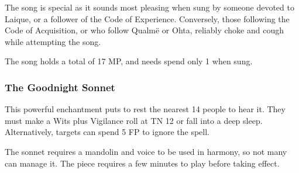 The song is special as it sounds most pleasing when sung by someone devoted to Laique, or a follower of the Code of Experience.  Conversely, those following the Code of Acquisition, or who follow Qualm\"{e} or Ohta, reliably choke and cough while attempting the song.

The song holds a total of 17 MP, and needs spend only 1 when sung.

\subsubsection{The Goodnight Sonnet}
This powerful enchantment puts to rest the nearest 14 people to hear it.  They must make a Wits plus Vigilance roll at TN 12 or fall into a deep sleep.  Alternatively, targets can spend 5 FP to ignore the spell.

The sonnet requires a mandolin and voice to be used in harmony, so not many can manage it.  The piece requires a few minutes to play before taking effect.



